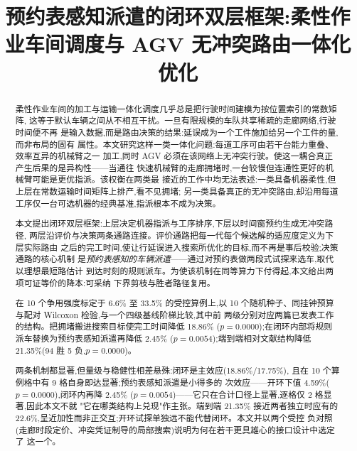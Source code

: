 \documentclass[manuscript,screen,review]{acmart}
\newcommand{\NCases}{10}
\newcommand{\NSeeds}{10}
\newcommand{\GainLoopRule}{18.86\%}      %
\newcommand{\PLoopRule}{0.0000}
\newcommand{\GainLoopProbe}{17.75\%}     %
\newcommand{\GainProbeOpen}{4.59\%}      %
\newcommand{\PProbeOpen}{0.0000}
\newcommand{\GainProbeLoop}{2.45\%}      %
\newcommand{\PProbeLoop}{0.0054}
\newcommand{\GainEndToEnd}{21.35\%}      %
\newcommand{\PEndToEnd}{0.0000}
\newcommand{\WinEndToEnd}{94}
\newcommand{\LoseEndToEnd}{5}
\newcommand{\GainIndepProduct}{22.6\%}
\newcommand{\CellsSigLoop}{9}
\newcommand{\CellsSigProbe}{2}
\newcommand{\ContentionLo}{6.6\%}
\newcommand{\ContentionHi}{33.5\%}
\begin{document}
\title[预约表感知派遣的闭环双层调度框架]{预约表感知派遣的闭环双层框架:柔性作业车间调度与 AGV 无冲突路由一体化优化}


\begin{abstract}
柔性作业车间的加工与运输一体化调度几乎总是把行驶时间建模为按位置索引的常数矩阵,
这等于默认车辆之间从不相互干扰。一旦有限规模的车队共享稀疏的走廊网络,行驶时间便不再
是输入数据,而是路由决策的结果:延误成为一个工件施加给另一个工件的量,而非布局的固有
属性。本文研究这样一类一体化问题:每道工序可由若干台能力重叠、效率互异的机械臂之一
加工,同时 AGV 必须在该网络上无冲突行驶。使这一耦合真正产生后果的是异构性——当通往
快速机械臂的走廊拥堵时,一台较慢但连通性更好的机械臂可能是更优指派。该权衡在两类最
接近的工作中均无法表述:一类具备机器柔性,但上层在常数运输时间矩阵上排产,看不见拥堵;
另一类具备真正的无冲突路由,却沿用每道工序仅一台可选机器的经典基准,指派根本不成为决策。

本文提出闭环双层框架:上层决定机器指派与工序排序,下层以时间窗预约生成无冲突路径,
两层沿评价与决策两条通路连接。评价通路把每一代每个候选解的适应度定义为下层实际路由
之后的完工时间,使让行延误进入搜索所优化的目标,而不再是事后校验;决策通路的核心机制
是\emph{预约表感知的车辆派遣}——通过对预约表做两段式试探来选车,取代以理想最短路估计
到达时刻的规则派车。为使该机制在同等算力下付得起,本文给出两项可证等价的降本:可采纳
下界剪枝与胜者路径复用。

在 \NCases{} 个争用强度标定于 \ContentionLo{} 至 \ContentionHi{} 的受控算例上,以
\NSeeds{} 个随机种子、同挂钟预算与配对 Wilcoxon 检验,与一个四级基线阶梯比较,其中前
两级分别对应两篇已发表工作的结构。把拥堵搬进搜索目标使完工时间降低 \GainLoopRule{}
($p=\PLoopRule$);在闭环内部将规则派车替换为预约表感知派遣再降低 \GainProbeLoop{}
($p=\PProbeLoop$);端到端相对文献结构降低 \GainEndToEnd{}(\WinEndToEnd{} 胜
\LoseEndToEnd{} 负,$p=\PEndToEnd$)。

两条机制都显著,但量级与稳健性相差悬殊:闭环是主效应(\GainLoopRule{}/\GainLoopProbe{}),
且在 \NCases{} 个算例格中有 \CellsSigLoop{} 格自身即达显著;预约表感知派遣是小得多的
次效应——开环下值 \GainProbeOpen{}($p=\PProbeOpen$),闭环内再降 \GainProbeLoop{}
($p=\PProbeLoop$)——它只在合计口径上显著,逐格仅 \CellsSigProbe{} 格显著,因此本文不就
"它在哪类结构上兑现"作主张。端到端 \GainEndToEnd{} 接近两者独立时应有的
\GainIndepProduct{},呈近加性而非正交互;开环试探单独远不能代替闭环。本文并以两个受控
负对照(走廊时段定价、冲突凭证制导的局部搜索)说明为何在若干更具雄心的接口设计中选定了
这一个。
\end{abstract}
\end{document}
